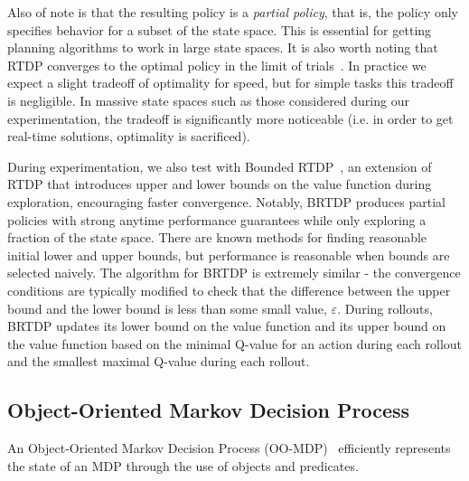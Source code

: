 \documentclass[11pt]{article}
\begin{document}
Also of note is that the resulting policy is a {\it partial policy}, that is, the policy only specifies behavior for a subset of the state space. This is essential for getting planning algorithms to work in large state spaces. It is also worth noting that RTDP converges to the optimal policy in the limit of trials~\cite{barto1995learning}. In practice we expect a slight tradeoff of optimality for speed, but for simple tasks this tradeoff is negligible. In massive state spaces such as those considered during our experimentation, the tradeoff is significantly more noticeable (i.e. in order to get real-time solutions, optimality is sacrificed).

During experimentation, we also test with Bounded RTDP~\cite{mcmahan2005bounded}, an extension of RTDP that introduces upper and lower bounds on the value function during exploration, encouraging faster convergence. Notably, BRTDP produces partial policies with strong anytime performance guarantees while only exploring a fraction of the state space. There are known methods for finding reasonable initial lower and upper bounds, but performance is reasonable when bounds are selected naively. The algorithm for BRTDP is extremely similar - the convergence conditions are typically modified to check that the difference between the upper bound and the lower bound is less than some small value, $\varepsilon$. During rollouts, BRTDP updates its lower bound on the value function and its upper bound on the value function based on the minimal Q-value for an action during each rollout and the smallest maximal Q-value during each rollout.

\subsection{Object-Oriented Markov Decision Process}

An Object-Oriented Markov Decision Process (OO-MDP)~\cite{diuk08} efficiently represents the state
of an MDP through the use of objects and predicates. \\
\end{document}
